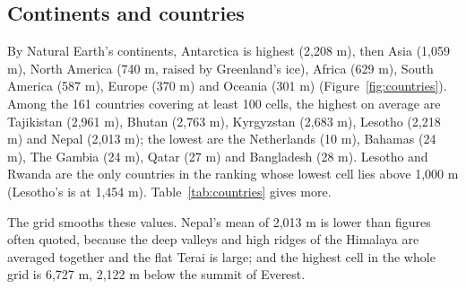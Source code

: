 \documentclass[11pt,a4paper]{article}
\begin{document}
\subsection{Continents and countries}
By Natural Earth's continents, Antarctica is highest (2,208 m), then Asia (1,059 m), North America (740 m, raised by Greenland's ice), Africa (629 m), South America (587 m), Europe (370 m) and Oceania (301 m) (Figure~\ref{fig:countries}). Among the 161 countries covering at least 100 cells, the highest on average are Tajikistan (2,961 m), Bhutan (2,763 m), Kyrgyzstan (2,683 m), Lesotho (2,218 m) and Nepal (2,013 m); the lowest are the Netherlands (10 m), Bahamas (24 m), The Gambia (24 m), Qatar (27 m) and Bangladesh (28 m). Lesotho and Rwanda are the only countries in the ranking whose lowest cell lies above 1,000 m (Lesotho's is at 1,454 m). Table~\ref{tab:countries} gives more.

The grid smooths these values. Nepal's mean of 2,013 m is lower than figures often quoted, because the deep valleys and high ridges of the Himalaya are averaged together and the flat Terai is large; and the highest cell in the whole grid is 6,727 m, 2,122 m below the summit of Everest.
\end{document}
